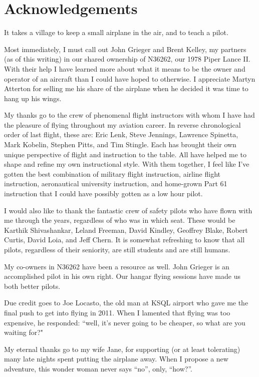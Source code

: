 \section*{Acknowledgements}

It takes a village to keep a small airplane in the air, and to teach a pilot.

Most immediately, I must call out John Grieger and Brent Kelley, my partners (as of this writing) in our shared ownership of N36262, our 1978 Piper Lance II. With their help I have learned more about what it means to be the owner and operator of an aircraft than I could have hoped to otherwise. I appreciate Martyn Atterton for selling me his share of the airplane when he decided it was time to hang up his wings.

My thanks go to the crew of phenomenal flight instructors with whom I have had the pleasure of flying throughout my aviation career. In reverse chronological order of last flight, these are: Eric Lenk, Steve Jennings, Lawrence Spinetta, Mark Kobelin, Stephen Pitts, and Tim Stingle. Each has brought their own unique perspective of flight and instruction to the table. All have helped me to shape and refine my own instructional style. With them together, I feel like I've gotten the best combination of military flight instruction, airline flight instruction, aeronautical university instruction, and home-grown Part 61 instruction that I could have possibly gotten as a low hour pilot.

I would also like to thank the fantastic crew of safety pilots who have flown with me through the years, regardless of who was in which seat. These would be Karthik Shivashankar, Leland Freeman, David Kindley, Geoffrey Blake, Robert Curtis, David Loia, and Jeff Chern. It is somewhat refreshing to know that all pilots, regardless of their seniority, are still students and are still humans.

My co-owners in N36262 have been a resource as well. John Grieger is an accomplished pilot in his own right. Our hangar flying sessions have made us both better pilots.

Due credit goes to Joe Locasto, the old man at KSQL airport who gave me the final push to get into flying in 2011. When I lamented that flying was too expensive, he responded: ``well, it's never going to be cheaper, so what are you waiting for?"

My eternal thanks go to my wife Jane, for supporting (or at least tolerating) many late nights spent putting the airplane away. When I propose a new adventure, this wonder woman never says ``no'', only, ``how?''.



